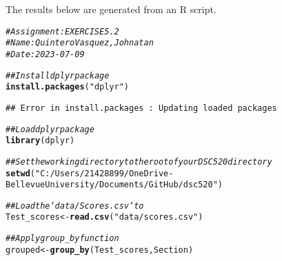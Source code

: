 \documentclass{article}\usepackage[]{graphicx}\usepackage[]{xcolor}
\makeatletter
\newcommand{\hlstr}[1]{\textcolor[rgb]{0.192,0.494,0.8}{#1}}%
\newcommand{\hlcom}[1]{\textcolor[rgb]{0.678,0.584,0.686}{\textit{#1}}}%
\newcommand{\hlstd}[1]{\textcolor[rgb]{0.345,0.345,0.345}{#1}}%
\newcommand{\hlkwb}[1]{\textcolor[rgb]{0.69,0.353,0.396}{#1}}%
\newcommand{\hlkwd}[1]{\textcolor[rgb]{0.737,0.353,0.396}{\textbf{#1}}}%
\newenvironment{kframe}{%
 \def\at@end@of@kframe{}%
 \ifinner\ifhmode%
  \def\at@end@of@kframe{\end{minipage}}%
  \begin{minipage}{\columnwidth}%
 \fi\fi%
 \def\FrameCommand##1{\hskip\@totalleftmargin \hskip-\fboxsep
 \colorbox{shadecolor}{##1}\hskip-\fboxsep
     \hskip-\linewidth \hskip-\@totalleftmargin \hskip\columnwidth}%
 \MakeFramed {\advance\hsize-\width
   \@totalleftmargin\z@ \linewidth\hsize
   \@setminipage}}%
 {\par\unskip\endMakeFramed%
 \at@end@of@kframe}
\newenvironment{knitrout}{}{} %
\makeatother
\begin{document}
The results below are generated from an R script.

\begin{knitrout}
\color{fgcolor}\begin{kframe}
\begin{alltt}
\hlcom{# Assignment: EXERCISE 5.2}
\hlcom{# Name: Quintero Vasquez, Johnatan}
\hlcom{# Date: 2023-07-09}

\hlcom{## Install dplyr package}
\hlkwd{install.packages}\hlstd{(}\hlstr{"dplyr"}\hlstd{)}
\end{alltt}
\begin{verbatim}
## Error in install.packages : Updating loaded packages
\end{verbatim}
\begin{alltt}
\hlcom{## Load dplyr package}
\hlkwd{library}\hlstd{(dplyr)}

\hlcom{## Set the working directory to the root of your DSC 520 directory}
\hlkwd{setwd}\hlstd{(}\hlstr{"C:/Users/21428899/OneDrive-Bellevue University/Documents/GitHub/dsc520"}\hlstd{)}

\hlcom{## Load the `data/Scores.csv` to}
\hlstd{Test_scores} \hlkwb{<-} \hlkwd{read.csv}\hlstd{(}\hlstr{"data/scores.csv"}\hlstd{)}


\hlcom{## Apply group_by function}
\hlstd{grouped} \hlkwb{<-} \hlkwd{group_by}\hlstd{(Test_scores, Section)}


\end{alltt}
\end{kframe}
\end{knitrout}
\end{document}
